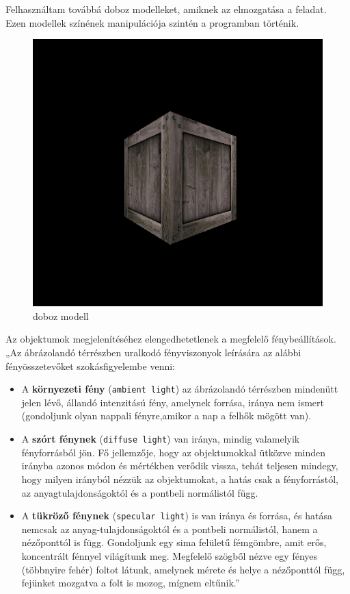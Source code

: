 Felhasználtam továbbá doboz modelleket, amiknek az elmozgatása a feladat. Ezen modellek színének manipulációja szintén a programban történik.
\begin{figure}[htp]
    \centering
   	\includegraphics[width=4truecm, height=3truecm]{images/box.png}
	\caption{doboz modell}
\end{figure}


Az objektumok megjelenítéséhez elengedhetetlenek a megfelelő fénybeállítások.\\

„Az ábrázolandó térrészben uralkodó fényviszonyok leírására az alábbi fényösszetevőket szokásfigyelembe venni:

\begin{itemize}
\item A {\bf környezeti fény} (\texttt{ambient light}) az ábrázolandó térrészben mindenütt jelen lévő, állandó intenzitású fény, amelynek forrása, iránya nem ismert (gondoljunk olyan nappali fényre,amikor a nap a felhők mögött van).
\item A {\bf szórt fénynek} (\texttt{diffuse light}) van iránya, mindig valamelyik fényforrásból jön. Fő jellemzője, hogy az objektumokkal ütközve minden irányba azonos módon és mértékben verődik vissza, tehát teljesen mindegy, hogy milyen irányból nézzük az objektumokat, a hatás csak a fényforrástól, az anyagtulajdonságoktól és a pontbeli normálistól függ.
\item A {\bf tükröző fénynek} (\texttt{specular light}) is van iránya és forrása, és hatása nemcsak az anyag-tulajdonságoktól és a pontbeli normálistól, hanem a nézőponttól is függ. Gondoljunk egy sima felületű fémgömbre, amit erős, koncentrált fénnyel világítunk meg. Megfelelő szögből nézve egy fényes (többnyire fehér) foltot látunk, amelynek mérete és helye a nézőponttól függ, fejünket mozgatva a folt is mozog, mígnem eltűnik.”
\end{itemize}

